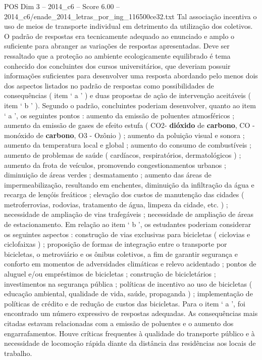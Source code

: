 \begin{textsample}{POS Dim 3 – 2014\_c6 – Score 6.00 – 2014\_c6/enade\_2014\_letras\_por\_ing\_116500ce32.txt}
Tal associação incentiva o uso de meios de transporte individual em detrimento da utilização dos coletivos.
O padrão de respostas era tecnicamente adequado ao enunciado e amplo o suficiente para abranger as variações de respostas apresentadas.
Deve ser ressaltado que a proteção ao ambiente ecologicamente equilibrado é tema conhecido dos concluintes dos cursos universitários, que deveriam possuir informações suficientes para desenvolver uma resposta abordando pelo menos dois dos aspectos listados no padrão de respostas como possibilidades de consequências ( item ‘ a ’ ) e duas propostas de ação de intervenção aceitáveis ( item ‘ b ’ ).
Segundo o padrão, concluintes poderiam desenvolver, quanto ao item ‘ a ’, os seguintes pontos : aumento da emissão de poluentes atmosféricos ; aumento da emissão de gases de efeito estufa ( CO2- \textbf{dióxido} de \textbf{carbono}, CO - monóxido de \textbf{carbono}, O3 - Ozônio ) ; aumento da poluição visual e sonora ; aumento da temperatura local e global ; aumento do consumo de combustíveis ; aumento de problemas de saúde ( cardíacos, respiratórios, dermatológicos ) ; aumento da frota de veículos, promovendo congestionamentos urbanos ; diminuição de áreas verdes ; desmatamento ; aumento das áreas de impermeabilização, resultando em enchentes, diminuição da infiltração da água e recarga de lençóis freáticos ; elevação dos custos de manutenção das cidades ( metroferrovias, rodovias, tratamento de água, limpeza da cidade, etc. ) ; necessidade de ampliação de vias trafegáveis ; necessidade de ampliação de áreas de estacionamento.
Em relação ao item ‘ b ’, os estudantes poderiam considerar os seguintes aspectos : construção de vias exclusivas para bicicletas ( ciclovias e ciclofaixas ) ; proposição de formas de integração entre o transporte por bicicletas, o metroviário e os ônibus coletivos, a fim de garantir segurança e conforto em momentos de adversidades climáticas e relevo acidentado ; pontos de aluguel e/ou empréstimos de bicicletas ; construção de bicicletários ; investimentos na segurança pública ; políticas de incentivo ao uso de bicicletas ( educação ambiental, qualidade de vida, saúde, propaganda ) ; implementação de políticas de crédito e de redução de custos das bicicletas.
Para o item ‘ a ’, foi encontrado um número expressivo de respostas adequadas.
As consequências mais citadas estavam relacionadas com a emissão de poluentes e o aumento dos engarrafamentos.
Houve críticas frequentes à qualidade do transporte público e à necessidade de locomoção rápida diante da distância das residências aos locais de trabalho.

\end{textsample}
